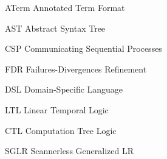 \begin{siglas}
  \item[ATerm] Annotated Term Format
  \item[AST] Abstract Syntax Tree
  \item[CSP] Communicating Sequential Processes	
  \item[FDR] Failures-Divergences Refinement
  \item[DSL] Domain-Specific Language
  \item[LTL] Linear Temporal Logic
  \item[CTL] Computation Tree Logic
  \item[SGLR] Scannerless Generalized LR
\end{siglas}